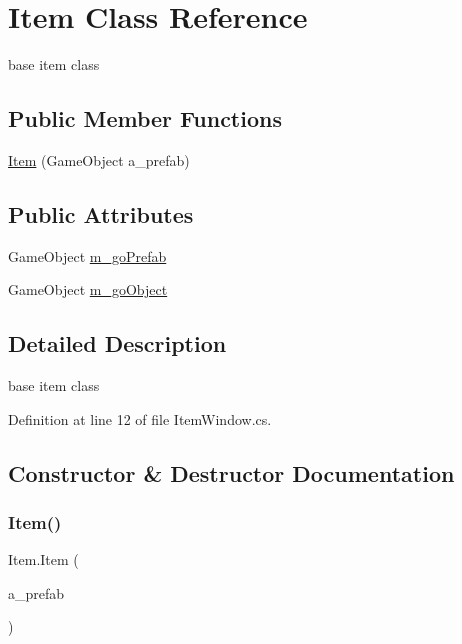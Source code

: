 \hypertarget{class_item}{}\section{Item Class Reference}
\label{class_item}


base item class  


\subsection*{Public Member Functions}
\begin{DoxyCompactItemize}
\item 
\mbox{\hyperlink{class_item_a87aa536c5fe89a32e3658b361e4f730d}{Item}} (Game\+Object a\+\_\+prefab)
\end{DoxyCompactItemize}
\subsection*{Public Attributes}
\begin{DoxyCompactItemize}
\item 
Game\+Object \mbox{\hyperlink{class_item_ae7c88eadc3a991079f15289361967d4a}{m\+\_\+go\+Prefab}}
\item 
Game\+Object \mbox{\hyperlink{class_item_a68e7854fff8405266afca47a85058c35}{m\+\_\+go\+Object}}
\end{DoxyCompactItemize}


\subsection{Detailed Description}
base item class 



Definition at line 12 of file Item\+Window.\+cs.



\subsection{Constructor \& Destructor Documentation}
\mbox{\label{class_item_a87aa536c5fe89a32e3658b361e4f730d}} 
\subsubsection{\texorpdfstring{Item()}{Item()}}
{\footnotesize\ttfamily Item.\+Item (\begin{DoxyParamCaption}\item[{Game\+Object}]{a\+\_\+prefab }\end{DoxyParamCaption})}



